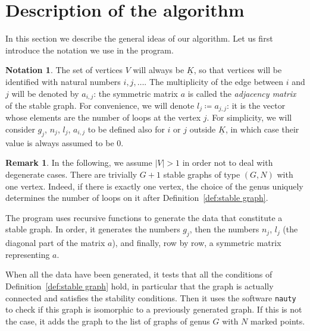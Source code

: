 \documentclass{amsart}
\theoremstyle{plain}
\theoremstyle{definition}
\newtheorem{remark}[theorem]{Remark}
\newtheorem{notation}[theorem]{Notation}
\newcommand{\abs}[1]{\left|#1\right|}
\newcommand{\ubar}[1]{\underline{#1}}
\begin{document}
\section{Description of the algorithm}\label{sec:description}

In this section we describe the general ideas of our algorithm. Let us
first introduce the notation we use in the program.

\begin{notation}\label{not:gnla}
  The set of vertices $V$ will always be $\ubar{K}$, so that vertices
  will be identified with natural numbers $i, j, \dots$. The
  multiplicity of the edge between $i$ and $j$ will be denoted by
  $a_{i,j}$: the symmetric matrix $a$ is called the \emph{adjacency
    matrix} of the stable graph. For convenience, we will denote $l_j
  \coloneqq a_{j,j}$: it is the vector whose elements are the number
  of loops at the vertex $j$. For simplicity, we will consider $g_j$,
  $n_j$, $l_j$, $a_{i,j}$ to be defined also for $i$ or $j$ outside
  $\ubar{K}$, in which case their value is always assumed to be $0$.
\end{notation}

\begin{remark}
  In the following, we assume $\abs{V} > 1$ in order not to deal with
  degenerate cases. There are trivially $G+1$ stable graphs of type
  $(G, N)$ with one vertex. Indeed, if there is exactly one vertex,
  the choice of the genus uniquely determines the number of loops on
  it after Definition~\ref{def:stable graph}.
\end{remark}

The program uses recursive functions to generate the data that
constitute a stable graph. In order, it generates the numbers $g_j$,
then the numbers $n_j$, $l_j$ (the diagonal part of the matrix $a$),
and finally, row by row, a symmetric matrix representing $a$.

When all the data have been generated, it tests that all the
conditions of Definition~\ref{def:stable graph} hold, in particular
that the graph is actually connected and satisfies the stability
conditions. Then it uses the software \texttt{nauty}~\cite{nauty} to
check if this graph is isomorphic to a previously generated graph. If
this is not the case, it adds the graph to the list of graphs of genus
$G$ with $N$ marked points.

\end{document}
